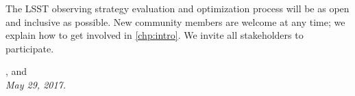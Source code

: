 \noindent The LSST observing strategy evaluation and optimization
process will be as open and inclusive as possible. New community members
are welcome at any time; we explain how to get involved in \autoref{chp:intro}.  We invite all stakeholders to participate.

\vspace{2\baselineskip}

{\raggedleft {},  and  \\
 \medskip \hspace{0.8\linewidth} \it May 29, 2017.}

\clearpage
